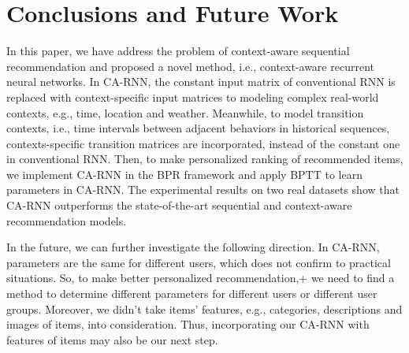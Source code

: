 \documentclass{sig-alternate}
\begin{document}




























\section{Conclusions and Future Work}

In this paper, we have address the problem of context-aware sequential recommendation and proposed a novel method, i.e., context-aware recurrent neural networks. In CA-RNN, the constant input matrix of conventional RNN is replaced with context-specific input matrices to modeling complex real-world contexts, e.g., time, location and weather. Meanwhile, to model transition contexts, i.e., time intervals between adjacent behaviors in historical sequences, contexts-specific transition matrices are incorporated, instead of the constant one in conventional RNN. Then, to make personalized ranking of recommended items, we implement CA-RNN in the BPR framework and apply BPTT to learn parameters in CA-RNN. The experimental results on two real datasets show that CA-RNN outperforms the state-of-the-art sequential and context-aware recommendation models.

In the future, we can further investigate the following direction. In CA-RNN, parameters are the same for different users, which does not confirm to practical situations. So, to make better personalized recommendation,+ we need to find a method to determine different parameters for different users or different user groups. Moreover, we didn't take items' features, e.g., categories, descriptions and images of items, into consideration. Thus, incorporating our CA-RNN with features of items may also be our next step.

\small


\vspace{2cm}



\balancecolumns
\end{document}
